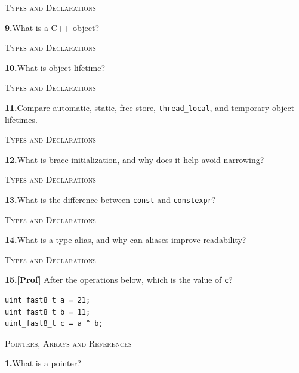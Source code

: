 \documentclass[11pt,a4paper]{article}
\newenvironment{questionblock}{%
  \begin{minipage}[t][0.455\textheight][t]{\textwidth}%
  \raggedright\small
}{%
  \vfill
  \end{minipage}%
}
\newcommand{\sectionlabel}[1]{\textsc{#1}\par\vspace{0.35em}}
\newcommand{\questionnumber}[1]{\textbf{#1.}\enspace}
\begin{document}
\newpage
\begin{questionblock}
\sectionlabel{Types and Declarations}
\questionnumber{9}What is a C++ object?\par
\end{questionblock}
\vspace*{0.04\textheight}
\begin{questionblock}
\sectionlabel{Types and Declarations}
\questionnumber{10}What is object lifetime?\par
\end{questionblock}
\newpage
\begin{questionblock}
\sectionlabel{Types and Declarations}
\questionnumber{11}Compare automatic, static, free-store, \verb|thread_local|, and temporary object lifetimes.\par
\end{questionblock}
\vspace*{0.04\textheight}
\begin{questionblock}
\sectionlabel{Types and Declarations}
\questionnumber{12}What is brace initialization, and why does it help avoid narrowing?\par
\end{questionblock}
\newpage
\begin{questionblock}
\sectionlabel{Types and Declarations}
\questionnumber{13}What is the difference between \verb|const| and \verb|constexpr|?\par
\end{questionblock}
\vspace*{0.04\textheight}
\begin{questionblock}
\sectionlabel{Types and Declarations}
\questionnumber{14}What is a type alias, and why can aliases improve readability?\par
\end{questionblock}
\newpage
\begin{questionblock}
\sectionlabel{Types and Declarations}
\questionnumber{15}\textbf{[Prof]} After the operations below, which is the value of \verb|c|?\par

\begin{verbatim}
uint_fast8_t a = 21;
uint_fast8_t b = 11;
uint_fast8_t c = a ^ b;
\end{verbatim}

\end{questionblock}
\vspace*{0.04\textheight}
\begin{questionblock}
\sectionlabel{Pointers, Arrays and References}
\questionnumber{1}What is a pointer?\par
\end{questionblock}
\end{document}
